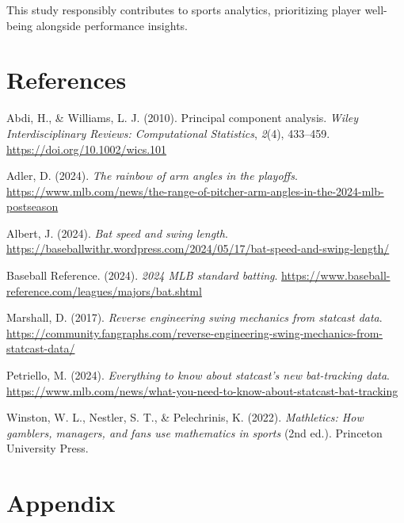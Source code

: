 \documentclass[
]{article}
\newlength{\cslhangindent}
\newlength{\cslentryspacingunit} %
\newenvironment{CSLReferences}[2] %
 {%
  \setlength{\parindent}{0pt}
  \ifodd #1
  \let\oldpar\par
  \def\par{\hangindent=\cslhangindent\oldpar}
  \fi
  \setlength{\parskip}{#2\cslentryspacingunit}
 }%
 {}
\begin{document}
This study responsibly contributes to sports analytics, prioritizing
player well-being alongside performance insights.

\hypertarget{references}{%
\section{References}\label{references}}

\hypertarget{refs}{}
\begin{CSLReferences}{1}{0}
\leavevmode{}%
Abdi, H., \& Williams, L. J. (2010). Principal component analysis.
\emph{Wiley Interdisciplinary Reviews: Computational Statistics},
\emph{2}(4), 433--459. \url{https://doi.org/10.1002/wics.101}

\leavevmode{}%
Adler, D. (2024). \emph{The rainbow of arm angles in the playoffs}.
\url{https://www.mlb.com/news/the-range-of-pitcher-arm-angles-in-the-2024-mlb-postseason}

\leavevmode{}%
Albert, J. (2024). \emph{Bat speed and swing length}.
\url{https://baseballwithr.wordpress.com/2024/05/17/bat-speed-and-swing-length/}

\leavevmode{}%
Baseball Reference. (2024). \emph{2024 MLB standard batting}.
\url{https://www.baseball-reference.com/leagues/majors/bat.shtml}

\leavevmode{}%
Marshall, D. (2017). \emph{Reverse engineering swing mechanics from
statcast data}.
\url{https://community.fangraphs.com/reverse-engineering-swing-mechanics-from-statcast-data/}

\leavevmode{}%
Petriello, M. (2024). \emph{Everything to know about statcast's new
bat-tracking data}.
\url{https://www.mlb.com/news/what-you-need-to-know-about-statcast-bat-tracking}

\leavevmode{}%
Winston, W. L., Nestler, S. T., \& Pelechrinis, K. (2022).
\emph{Mathletics: How gamblers, managers, and fans use mathematics in
sports} (2nd ed.). Princeton University Press.

\end{CSLReferences}

\clearpage

\hypertarget{appendix}{%
\section{Appendix}\label{appendix}}
\end{document}
